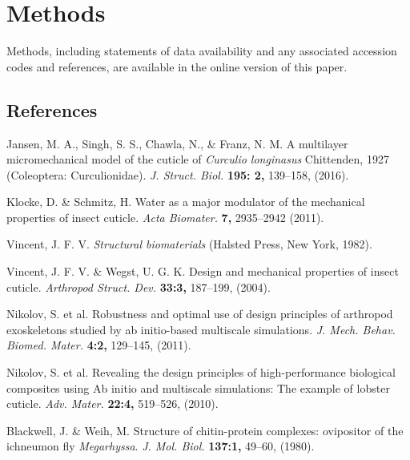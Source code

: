 \documentclass[twocolumn, linenumbers, superscriptaddress, nofootinbib]{revtex4-1}
\begin{document}
	\section{Methods}
		Methods, including statements of data availability and any associated accession codes and references, are available in the online version of this paper.
	
	\begin{thebibliography}{50}
		\section*{References}
				Jansen, M. A., Singh, S. S., Chawla, N., \& Franz, N. M.
				A multilayer micromechanical model of the cuticle of \textit{Curculio longinasus} Chittenden, 1927 (Coleoptera: Curculionidae).
				\textit{J. Struct. Biol.}
				\textbf{195: 2,}
				139--158,
				(2016).
				
				Klocke, D. \& Schmitz, H.
				Water as a major modulator of the mechanical properties of insect cuticle.
				\textit{Acta Biomater.}
				\textbf{7,}
				2935--2942
				(2011).
				
				Vincent, J. F. V.
				\textit{Structural biomaterials}
				(Halsted Press,
				New York,
				1982).
				
				Vincent, J. F. V. \& Wegst, U. G. K.
				Design and mechanical properties of insect cuticle.				
				\textit{Arthropod Struct. Dev.}
				\textbf{33:3,}
				187--199,
				(2004).
				
				Nikolov, S. et al.
				Robustness and optimal use of design principles of arthropod exoskeletons studied by ab initio-based multiscale simulations.
				\textit{J. Mech. Behav. Biomed. Mater.}
				\textbf{4:2,}
				129--145,
				(2011).
				
				Nikolov, S. et al.
				Revealing the design principles of high-performance biological composites using Ab initio and multiscale simulations: The example of lobster cuticle.
				\textit{Adv. Mater.}
				\textbf{22:4,}
				519--526,
				(2010).
				
				Blackwell, J. \& Weih, M.
				Structure of chitin-protein complexes: ovipositor of the ichneumon fly \textit{Megarhyssa}.
				\textit{J. Mol. Biol.}
				\textbf{137:1,}
				49--60,
				(1980).


\end{thebibliography}
\end{document}
